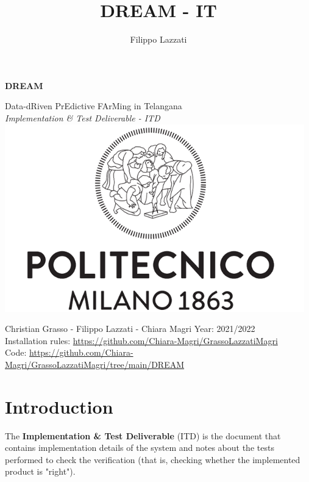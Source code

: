 \documentclass{article}
\title{DREAM - IT}
\author{Filippo Lazzati}
\begin{document}
\thispagestyle{empty} 
\begin{titlepage}
    \begin{center}
       {\Huge \textbf{DREAM}} %
       \vspace{0.5cm}
       \\
    \begin{LARGE}
        {Data-dRiven PrEdictive FArMing in Telangana}
        \vspace{1.0cm}
        \\
        {\textit{Implementation \& Test Deliverable - ITD}}
        \includegraphics[width=13cm]{logo/polimi.png}
       \vspace{1.0cm}
        
        {Christian Grasso - Filippo Lazzati - Chiara Magri}
       \vspace{0.5cm}
       {Year: 2021/2022}
       \\
       {Installation rules: \url{https://github.com/Chiara-Magri/GrassoLazzatiMagri}}\\
       {Code: \url{https://github.com/Chiara-Magri/GrassoLazzatiMagri/tree/main/DREAM}}
       
    \end{LARGE}  
   \end{center}
\end{titlepage}
\newpage
\tableofcontents 
\newpage
\section{Introduction}
The \textbf{Implementation \& Test Deliverable} (ITD) is the document that contains implementation details of the system and notes about the tests performed to check the verification (that is, checking whether the implemented product is "right").
\end{document}
